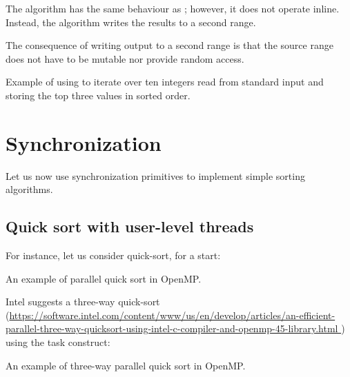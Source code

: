 The  algorithm has the same behaviour as \linebreak{}; however, it does not operate inline. Instead, the algorithm writes the results to a second range.


The consequence of writing output to a second range is that the source range does not have to be mutable nor provide random access.

\begin{codebox}[]{\href{https://compiler-explorer.com/z/Ehjbhfj9s}{\ExternalLink}}
\footnotesize Example of using  to iterate over ten integers read from standard input and storing the top three values in sorted order.
\tcblower
{}
\end{codebox}

\section{Synchronization}

Let us now use synchronization primitives to implement simple sorting algorithms. 

\subsection{Quick sort with user-level threads}

For instance, let us consider quick-sort, for a start:

\begin{codebox}[breakable]{}
\footnotesize An example of parallel quick sort in OpenMP.
\tcblower
{}
\end{codebox}

Intel suggests a three-way quick-sort (\url{https://software.intel.com/content/www/us/en/develop/articles/an-efficient-parallel-three-way-quicksort-using-intel-c-compiler-and-openmp-45-library.html
}) using the task construct:

\begin{codebox}[breakable]{}
\footnotesize An example of three-way parallel quick sort in OpenMP.
\tcblower
{}
\end{codebox}

